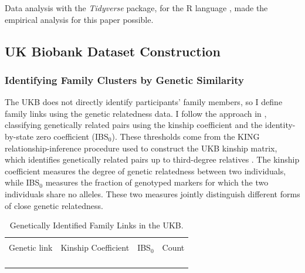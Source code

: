 Data analysis with the \textit{Tidyverse} \citep{tidyverse} package, for the R language \citep{R2023}, made the empirical analysis for this paper possible.

\subsection{UK Biobank Dataset Construction}

\subsubsection{Identifying Family Clusters by Genetic Similarity}
\label{appendix:identifying-families}

The UKB does not directly identify participants' family members, so I define family links using the genetic relatedness data.
I follow the approach in \citet{muslimova2025environment}, classifying genetically related pairs using the kinship coefficient and the identity-by-state zero coefficient (IBS$_0$).
These thresholds come from the KING relationship-inference procedure used to construct the UKB kinship matrix, which identifies genetically related pairs up to third-degree relatives \citep{manichaikul2010robust}.
The kinship coefficient measures the degree of genetic relatedness between two individuals, while IBS$_0$ measures the fraction of genotyped markers for which the two individuals share no alleles.
These two measures jointly distinguish different forms of close genetic relatedness.

\begin{table}[!h]
    \singlespacing
    \centering
    \small
    \caption{Genetically Identified Family Links in the UKB.}
    \begin{tabular}{l c c c}
        \\[-1.8ex]\hline \hline \\[-1.8ex] 
        Genetic link & Kinship Coefficient & IBS$_0$ & Count \\
        \\[-1.8ex]\hline \hline \\[-1.8ex] 
        
        \\[-1.8ex]\hline \\[-1.8ex]
    \end{tabular}
    \vspace{-0.25cm}
    \label{tab:ukb-relations-count}
\end{table}

